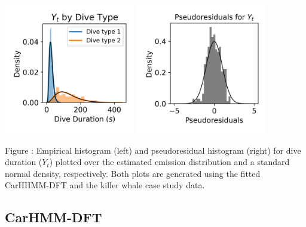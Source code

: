 \documentclass{article}
\begin{document}
        \begin{center}
        \includegraphics[width=2.25in]{../Plots/2019/20190902-182840-CATs_OB_1_0_267_CarHHMM1_empirical_hist_dive_duration.png}
        \includegraphics[width=2.25in]{../Plots/2019/20190902-182840-CATs_OB_1_0_267_CarHHMM1_pseudresids_Dive_Duration.png}
        \end{center}
        
        \noindent Figure : Empirical histogram (left) and pseudoresidual histogram (right) for dive duration ($Y_{t}$) plotted over the estimated emission distribution and a standard normal density, respectively. Both plots are generated using the fitted CarHHMM-DFT and the killer whale case study data.
        \addtocounter{fignum}{1}
        
        \subsection{CarHMM-DFT}
        
\end{document}
